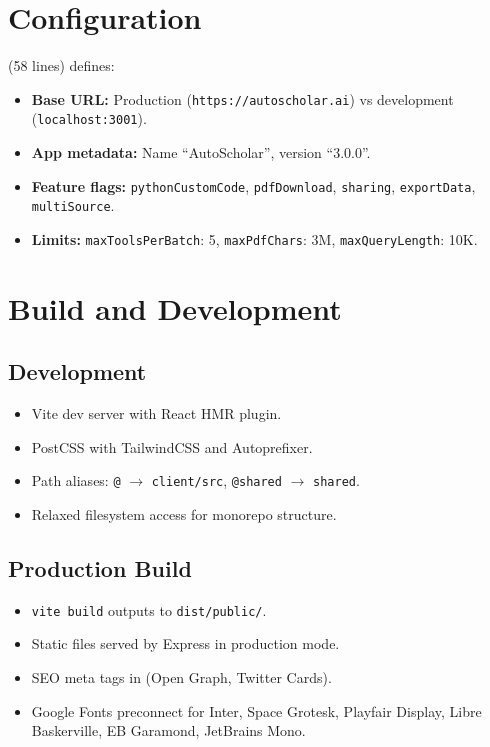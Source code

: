 \section{Configuration}
\label{sec:frontend:config}

 (58 lines) defines:

\begin{itemize}
  \item \textbf{Base URL:} Production (\texttt{https://autoscholar.ai}) vs development (\texttt{localhost:3001}).
  \item \textbf{App metadata:} Name ``AutoScholar'', version ``3.0.0''.
  \item \textbf{Feature flags:} \texttt{pythonCustomCode}, \texttt{pdfDownload}, \texttt{sharing}, \texttt{exportData}, \texttt{multiSource}.
  \item \textbf{Limits:} \texttt{maxToolsPerBatch}: 5, \texttt{maxPdfChars}: 3M, \texttt{maxQueryLength}: 10K.
\end{itemize}

\section{Build and Development}
\label{sec:frontend:build}

\subsection{Development}

\begin{itemize}
  \item Vite dev server with React HMR plugin.
  \item PostCSS with TailwindCSS and Autoprefixer.
  \item Path aliases: \texttt{@} $\to$ \texttt{client/src}, \texttt{@shared} $\to$ \texttt{shared}.
  \item Relaxed filesystem access for monorepo structure.
\end{itemize}

\subsection{Production Build}

\begin{itemize}
  \item \texttt{vite build} outputs to \texttt{dist/public/}.
  \item Static files served by Express in production mode.
  \item SEO meta tags in  (Open Graph, Twitter Cards).
  \item Google Fonts preconnect for Inter, Space Grotesk, Playfair Display, Libre Baskerville, EB Garamond, JetBrains Mono.
\end{itemize}
